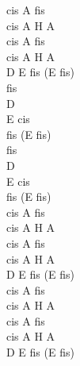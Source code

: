 \documentclass[a5paper, 10pt]{book}
\begin{document}
\begin{minipage}[t]{0.2\textwidth}
cis A fis\\
cis A H A\\
cis A fis\\
cis A H A\\
D E fis (E fis)\\

fis\\
D\\
E cis\\
fis (E fis)\\

fis\\
D\\
E cis\\
fis (E fis)\\

cis A fis\\
cis A H A\\
cis A fis\\
cis A H A\\
D E fis (E fis)\\

cis A fis\\
cis A H A\\
cis A fis\\
cis A H A\\
D E fis (E fis)\\
\end{minipage}

\newpage
\end{document}
